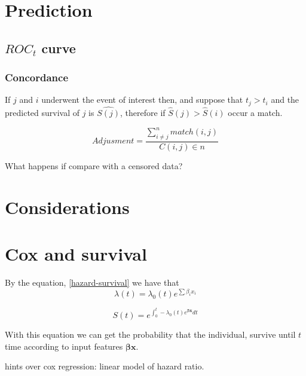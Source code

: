 \documentclass[10pt,a4paper]{article}
\begin{document}
\section{Prediction}


\subsection{$ROC_{t}$ curve }



\subsubsection{Concordance}
If $j$ and $i$ underwent the event of interest then, and suppose that $t_{j} > t_{i}$  and the predicted survival of $j$ is $\hat{S(j)}$, therefore if $\hat{S}(j) > \hat{S}(i)$  occur a match. 

\begin{equation}
Adjusment = \frac{\sum_{i \neq j}^{n} match(i,j)}{C(i,j) \in n}
\end{equation}

What happens if compare with a censored data?

\section{Considerations}







\section{Cox and survival}
By the equation, \eqref{hazard-survival} we have that 
\begin{equation}
\lambda(t) = \lambda_{0}(t)e^{\sum \beta_{i}x_{i}}
\end{equation}


\begin{equation}
S(t) = e^{\int_{0}^{t} -  \lambda_{0}(t)e^{\mathbf{\beta x}}dt}
\label{last}
\end{equation}

With this equation we can get the probability that the individual, survive until $t$ time according to input features $\mathbf{\beta x}.$






hints over cox regression:
linear model of hazard ratio.
\end{document}
